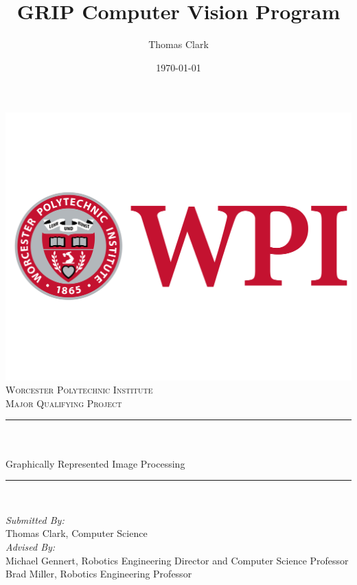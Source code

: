 \documentclass[12pt]{article}
\title{GRIP Computer Vision Program}
\author{Thomas Clark}
\date{\today}
\makeatletter
\let\thetitle\@title
\let\thedate\@date
\makeatother
\begin{document}

\begin{titlepage}
	\centering
    \includegraphics[scale = 0.25]{wpi.png}\\[1.0 cm]
    \textsc{\LARGE Worcester Polytechnic Institute}\\[1.0 cm]
	\textsc{\Large Major Qualifying Project}\\[0.5 cm]
	\rule{\linewidth}{0.2 mm} \\[0.4 cm]
	{ \huge \bfseries \thetitle}\\[0.4 cm]
    { \large Graphically Represented Image Processing}\\
	\rule{\linewidth}{0.2 mm} \\[1.0 cm]

	\begin{flushleft}
        \emph{Submitted By:}\\
        Thomas Clark, Computer Science\\
        [0.4 cm]
        \emph{Advised By:}\\
        Michael Gennert, Robotics Engineering Director and Computer Science Professor\\
        Brad Miller, Robotics Engineering Professor\\[2 cm]
   	\end{flushleft}

	{\large \thedate}\\[2 cm]

	\vfill

\end{titlepage}
\end{document}
